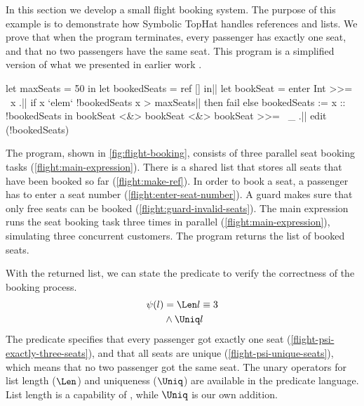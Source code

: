 In this section we develop a small flight booking system.
The purpose of this example is to demonstrate how Symbolic TopHat handles references and lists.
We prove that when the program terminates, every passenger has exactly one seat, and that no two passengers have the same seat.
This program is a simplified version of what we presented in earlier work \cite{Steenvoorden2019}.

\begin{TASK}[float=h
            ,numbers=right
            ,caption=Flight booking.
            ,label=fig:flight-booking
            ]
  let maxSeats = 50 in
  let bookedSeats = ref [] in|\label{flight:make-ref}|
  let bookSeat = enter Int >>= \ x .|\label{flight:enter-seat-number}|
    if x `elem` !bookedSeats \/ x > maxSeats|\label{flight:guard-invalid-seats}|
      then fail else bookedSeats := x :: !bookedSeats in
  bookSeat <&> bookSeat <&> bookSeat >>= \ _ .|\label{flight:main-expression}|
  edit (!bookedSeats)
\end{TASK}

The program, shown in \cref{fig:flight-booking}, consists of three parallel seat booking tasks (\cref{flight:main-expression}).
There is a shared list that stores all seats that have been booked so far (\cref{flight:make-ref}).
In order to book a seat, a passenger has to enter a seat number (\cref{flight:enter-seat-number}).
A guard makes sure that only free seats can be booked (\cref{flight:guard-invalid-seats}).
The main expression runs the seat booking task three times in parallel (\cref{flight:main-expression}), simulating three concurrent customers.
The program returns the list of booked seats.

With the returned list, we can state the predicate to verify the correctness of the booking process.
\setcounter{equation}{0}
\begin{align}
\psi(l)
   & =      \Len l \equiv 3 \label{flight-psi-exactly-three-seats}
\\ & \wedge \Uniq l \label{flight-psi-unique-seats}
\end{align}
The predicate specifies that every passenger got exactly one seat (\ref{flight-psi-exactly-three-seats}), and that all seats are unique (\ref{flight-psi-unique-seats}), which means that no two passenger got the same seat.
The unary operators for list length ($\Len$) and uniqueness ($\Uniq$) are available in the predicate language.
List length is a capability of \SMTLIB, while $\Uniq$ is our own addition.
